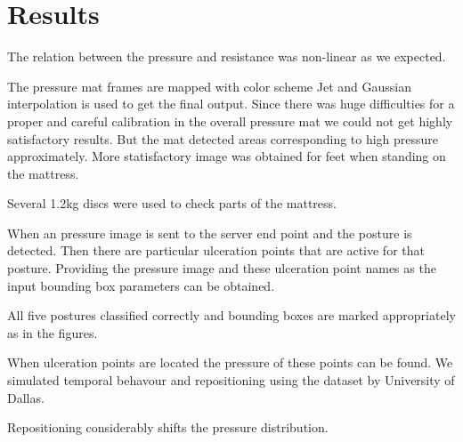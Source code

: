 \chapter{Results}
\label{chapter:results}



The relation between the pressure and resistance was non-linear as we expected.


 

The pressure mat frames are mapped with color scheme Jet and Gaussian interpolation is used to get the final output. Since there was huge difficulties for a proper and careful calibration in the overall pressure mat we could not get highly satisfactory results. But the mat detected areas corresponding to high pressure approximately. More statisfactory image was obtained for feet when standing on the mattress. 

Several 1.2kg discs were used to check parts of the mattress.

When an pressure image is sent to the server end point and the posture is detected. Then there are particular ulceration points that are active for that posture. Providing the pressure image and these ulceration point names as the input bounding box parameters can be obtained.

All five postures classified correctly and bounding boxes are marked appropriately as in the figures.

When ulceration points are located the pressure of these points can be found. We simulated temporal behavour and repositioning using the dataset by University of Dallas.

Repositioning considerably shifts the pressure distribution. 






